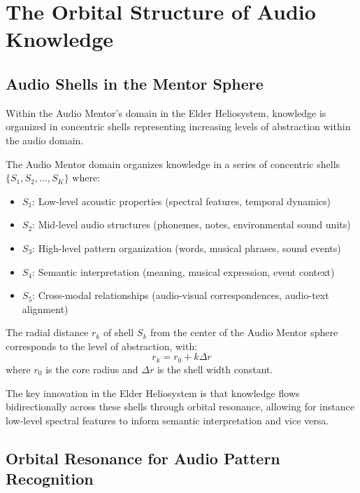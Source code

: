 \section{The Orbital Structure of Audio Knowledge}

\subsection{Audio Shells in the Mentor Sphere}

Within the Audio Mentor's domain in the Elder Heliosystem, knowledge is organized in concentric shells representing increasing levels of abstraction within the audio domain.

\begin{definition}
The Audio Mentor domain organizes knowledge in a series of concentric shells $\{S_1, S_2, \ldots, S_K\}$ where:
\begin{itemize}
    \item $S_1$: Low-level acoustic properties (spectral features, temporal dynamics)
    \item $S_2$: Mid-level audio structures (phonemes, notes, environmental sound units)
    \item $S_3$: High-level pattern organization (words, musical phrases, sound events)
    \item $S_4$: Semantic interpretation (meaning, musical expression, event context)
    \item $S_5$: Cross-modal relationships (audio-visual correspondences, audio-text alignment)
\end{itemize}
\end{definition}

\begin{proposition}
The radial distance $r_k$ of shell $S_k$ from the center of the Audio Mentor sphere corresponds to the level of abstraction, with:
\begin{equation}
r_k = r_0 + k \Delta r
\end{equation}
where $r_0$ is the core radius and $\Delta r$ is the shell width constant.
\end{proposition}

The key innovation in the Elder Heliosystem is that knowledge flows bidirectionally across these shells through orbital resonance, allowing for instance low-level spectral features to inform semantic interpretation and vice versa.

\subsection{Orbital Resonance for Audio Pattern Recognition}

